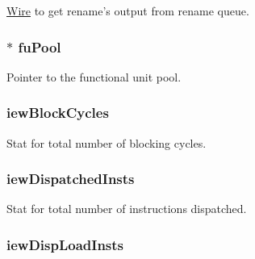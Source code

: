 \label{classDefaultIEW_a2b6b1d4785b92bd378f8a7abc5b7e6b9}
\hyperlink{classWire}{Wire} to get rename's output from rename queue. \hypertarget{classDefaultIEW_a480782fc1cfd21fd9748b26f2a08b97a}{
\subsubsection[{fuPool}]{$\ast$ {\bf fuPool}}}
\label{classDefaultIEW_a480782fc1cfd21fd9748b26f2a08b97a}
Pointer to the functional unit pool. \hypertarget{classDefaultIEW_a29d41a8f53acdfa4edcfa2c3238c8052}{
\subsubsection[{iewBlockCycles}]{ {\bf iewBlockCycles}}}
\label{classDefaultIEW_a29d41a8f53acdfa4edcfa2c3238c8052}
Stat for total number of blocking cycles. \hypertarget{classDefaultIEW_a60a497827df5bf20377131218dbb5856}{
\subsubsection[{iewDispatchedInsts}]{ {\bf iewDispatchedInsts}}}
\label{classDefaultIEW_a60a497827df5bf20377131218dbb5856}
Stat for total number of instructions dispatched. \hypertarget{classDefaultIEW_a4912d8eb8445e3613e37bd099b4838a5}{
\subsubsection[{iewDispLoadInsts}]{ {\bf iewDispLoadInsts}}}
\label{classDefaultIEW_a4912d8eb8445e3613e37bd099b4838a5}
